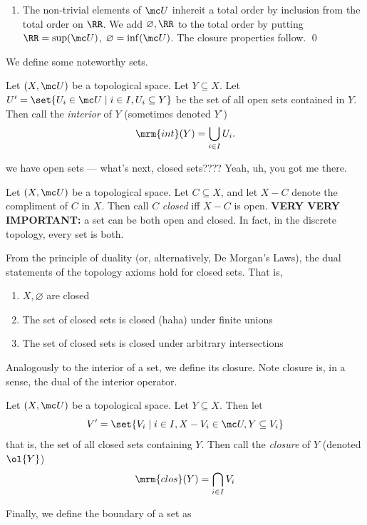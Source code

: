 \documentclass{fkbook}
\begin{document}
\begin{adjustwidth}{1em}{1em}
\begin{enumerate}[label=\arabic*.]
    \item The non-trivial elements of $\mc U$ inhereit a total order
      by inclusion from the total order on $\RR$. We add $\varnothing,
      \RR$ to the total order by putting $\RR = \sup (\mc U)$,
      $\varnothing = \inf (\mc U)$. The closure properties follow.
      \qed
  \end{enumerate}
  We define some noteworthy sets.
  \begin{definition}[Interior]
    Let $(X, \mc U)$ be a topological space. Let $Y \subseteq X$. Let
    $U' = \set{U_i \in \mc U \mid i \in I, U_i \subseteq Y}$ be the
    set of all open sets contained in $Y$. Then call the
    \emph{interior} of $Y$ (sometimes denoted $Y^\circ$)
    \[
      \mrm{int}(Y) = \bigcup_{i \in I} U_i.
    \]
  \end{definition}
  we have open sets --- what's next, closed sets???? Yeah, uh, you got
  me there.
  \begin{definition}
    Let $(X, \mc U)$ be a topological space. Let $C \subseteq X$, and
    let $X - C$ denote the compliment of $C$ in $X$. Then call $C$
    \emph{closed} iff $X - C$ is open. \textbf{VERY VERY IMPORTANT:}
    a set can be both open and closed. In fact, in the discrete
    topology, every set is both.
  \end{definition}
  From the principle of duality (or, alternatively, De Morgan's Laws),
  the dual statements of the topology axioms hold for closed sets.
  That is,
  \begin{enumerate}[label=\roman*.]
    \item $X, \varnothing$ are closed
    \item The set of closed sets is closed (haha) under finite unions
    \item The set of closed sets is closed under arbitrary
      intersections
  \end{enumerate}
  Analogously to the interior of a set, we define its closure. Note
  closure is, in a sense, the dual of the interior
  operator.
  \begin{definition}
    Let $(X, \mc U)$ be a topological space. Let $Y \subseteq X$. Then
    let
    \[
      V' = \set{V_i \mid i \in I, X - V_i \in \mc U, Y \subseteq V_i}
    \]
    that is, the set of all closed sets containing $Y$. Then call the
    \emph{closure} of $Y$ (denoted $\ol{Y}$)
    \[
      \mrm{clos}(Y) = \bigcap_{i \in I} V_i
    \]
  \end{definition}
  Finally, we define the boundary of a set as
  \begin{definition}

\end{definition}
\end{adjustwidth}
\end{document}
